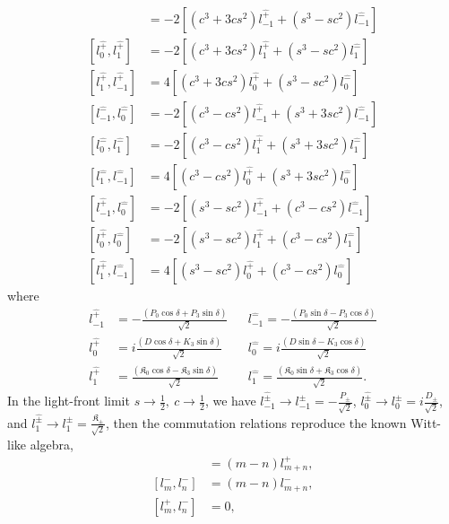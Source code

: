 \documentclass[%
 reprint,
superscriptaddress,
 amsmath,amssymb,
 aps,
]{revtex4-2}
\begin{document}
\begin{align}
    [l^{\hat{+}}_{-1},l^{\hat{+}}_{0}]&=-2[(c^{3}+3cs^{2})l^{\hat{+}}_{-1}+(s^{3}-sc^{2})l^{\hat{-}}_{-1}]\\
    [l^{\hat{+}}_{0},l^{\hat{+}}_{1}]&=-2[(c^{3}+3cs^{2})l^{\hat{+}}_{1}+(s^{3}-sc^{2})l^{\hat{-}}_{1}]\\
    [l^{\hat{+}}_{1},l^{\hat{+}}_{-1}]&=4[(c^{3}+3cs^{2})l^{\hat{+}}_{0}+(s^{3}-sc^{2})l^{\hat{-}}_{0}]\\
    [l^{\hat{-}}_{-1},l^{\hat{-}}_{0}]&=-2[(c^{3}-cs^{2})l^{\hat{+}}_{-1}+(s^{3}+3sc^{2})l^{\hat{-}}_{-1}]\\
    [l^{\hat{-}}_{0},l^{\hat{-}}_{1}]&=-2[(c^{3}-cs^{2})l^{\hat{+}}_{1}+(s^{3}+3sc^{2})l^{\hat{-}}_{1}]\\
    [l^{\hat{-}}_{1},l^{\hat{-}}_{-1}]&=4[(c^{3}-cs^{2})l^{\hat{+}}_{0}+(s^{3}+3sc^{2})l^{\hat{-}}_{0}]\\
    [l^{\hat{+}}_{-1},l^{\hat{-}}_{0}]&=-2[(s^{3}-sc^{2})l^{\hat{+}}_{-1}+(c^{3}-cs^{2})l^{\hat{-}}_{-1}]\\
    [l^{\hat{+}}_{0},l^{\hat{-}}_{0}]&=-2[(s^{3}-sc^{2})l^{\hat{+}}_{1}+(c^{3}-cs^{2})l^{\hat{-}}_{1}]\\
    [l^{\hat{+}}_{1},l^{\hat{-}}_{-1}]&=4[(s^{3}-sc^{2})l^{\hat{+}}_{0}+(c^{3}-cs^{2})l^{\hat{-}}_{0}]
\end{align}
where
\begin{align}
    l^{\hat{+}}_{-1}&=-\frac{(P_{0}\cos{\delta}+P_{3}\sin{\delta})}{\sqrt{2}} &&l^{\hat{-}}_{-1}=-\frac{(P_{0}\sin{\delta}-P_{3}\cos{\delta})}{\sqrt{2}}\\
    l^{\hat{+}}_{0}&=i\frac{(D\cos{\delta}+K_{3}\sin{\delta})}{\sqrt{2}} &&l^{\hat{-}}_{0}=i\frac{(D\sin{\delta}-K_{3}\cos{\delta})}{\sqrt{2}}\\
    l^{\hat{+}}_{1}&=\frac{(\mathfrak{K}_{0}\cos{\delta}-\mathfrak{K}_{3}\sin{\delta})}{\sqrt{2}} &&l^{\hat{-}}_{1}=\frac{(\mathfrak{K}_{0}\sin{\delta}+\mathfrak{K}_{3}\cos{\delta})}{\sqrt{2}}.
\end{align}
In the light-front limit $s\rightarrow\frac{1}{2},~c\rightarrow\frac{1}{2}$, we have $ l^{\hat{\pm}}_{-1}\rightarrow l^{\pm}_{-1}=-\frac{P_{\pm}}{\sqrt{2}}$, $l^{\hat{\pm}}_{0}\rightarrow l^{\pm}_{0}=i\frac{D_{\pm}}{\sqrt{2}}$, and $l^{\hat{\pm}}_{1}\rightarrow l^{\pm}_{1}= \frac{\mathfrak{K}_{\pm}}{\sqrt{2}}$, then the commutation relations reproduce the known Witt-like algebra,
\begin{align}
    [l^{+}_m,l^{+}_n]&=(m-n)l^{+}_{m+n},\\
    [l^{-}_m,l^{-}_n]&=(m-n)l^{-}_{m+n},\\
    [l^{+}_m,l^{-}_n]&=0,
\end{align}
\end{document}
